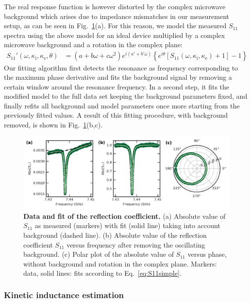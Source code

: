 % 
The real response function is however distorted by the complex microwave background which arises due to impedance mismatches in our measurement setup, as can be seen in Fig.~\ref{fig:s11fitabs}(a).
% 
For this reason, we model the measured $S_{11}$ spectra using the above model for an ideal device multiplied by a complex microwave background and a rotation in the complex plane:
% 
\begin{align}
S_{11}'(\omega,\kappa_\text{i},\kappa_\text{e},\theta) & = \left( a+b\omega+c\omega^2 \right) e^{i(a' + b' \omega)}  \left\{e^{i\theta}\left[S_{11}(\omega,\kappa_\text{i},\kappa_\text{e})+1\right]-1\right\}
\label{eq:S11full}
\end{align}
% 
Our fitting algorithm first detects the resonance as frequency corresponding to the maximum phase derivative and fits the background signal by removing a certain window around the resonance frequency.
% 
In a second step, it fits the modified model to the full data set keeping the background parameters fixed, and finally refits all background and model parameters once more starting from the previously fitted values.
% 
A result of this fitting procedure, with background removed, is shown in Fig.~\ref{fig:s11fitabs}(b,c).

\begin{figure}
	\centering
	\includegraphics[width=\linewidth]{chapter-currentdetection/figures/SM_reflection_coefficient}
	\caption{
		\textbf{Data and fit of the reflection coefficient.}
		(a) Absolute value of $S_{11}$ as measured (markers) with fit (solid line) taking into account background (dashed line).
		(b) Absolute value of the reflection coefficient $S_{11}$ versus frequency after removing the oscillating background.
		(c) Polar plot of the absolute value of $S_{11}$ versus phase, without background and rotation in the complex plane.
		Markers: data, solid lines: fits according to Eq.~\eqref{eq:S11simple}.
		\label{fig:s11fitabs}
	}
\end{figure}


\subsubsection{Kinetic inductance estimation}\label{sec:Lk}

